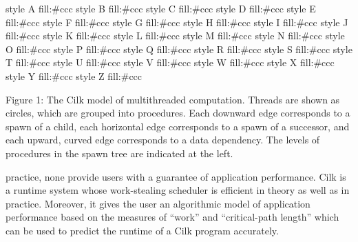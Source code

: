 \documentclass[
]{article}
\newenvironment{Shaded}{}{}
\newcommand{\NormalTok}[1]{#1}
\newcounter{none} %
\begin{document}
\begin{Shaded}
\begin{Highlighting}[]
\NormalTok{    style A fill:\#ccc}
\NormalTok{    style B fill:\#ccc}
\NormalTok{    style C fill:\#ccc}
\NormalTok{    style D fill:\#ccc}
\NormalTok{    style E fill:\#ccc}
\NormalTok{    style F fill:\#ccc}
\NormalTok{    style G fill:\#ccc}
\NormalTok{    style H fill:\#ccc}
\NormalTok{    style I fill:\#ccc}
\NormalTok{    style J fill:\#ccc}
\NormalTok{    style K fill:\#ccc}
\NormalTok{    style L fill:\#ccc}
\NormalTok{    style M fill:\#ccc}
\NormalTok{    style N fill:\#ccc}
\NormalTok{    style O fill:\#ccc}
\NormalTok{    style P fill:\#ccc}
\NormalTok{    style Q fill:\#ccc}
\NormalTok{    style R fill:\#ccc}
\NormalTok{    style S fill:\#ccc}
\NormalTok{    style T fill:\#ccc}
\NormalTok{    style U fill:\#ccc}
\NormalTok{    style V fill:\#ccc}
\NormalTok{    style W fill:\#ccc}
\NormalTok{    style X fill:\#ccc}
\NormalTok{    style Y fill:\#ccc}
\NormalTok{    style Z fill:\#ccc}
\end{Highlighting}
\end{Shaded}

Figure 1: The Cilk model of multithreaded computation. Threads are shown
as circles, which are grouped into procedures. Each downward edge
corresponds to a spawn of a child, each horizontal edge corresponds to a
spawn of a successor, and each upward, curved edge corresponds to a data
dependency. The levels of procedures in the spawn tree are indicated at
the left.

practice, none provide users with a guarantee of application
performance. Cilk is a runtime system whose work-stealing scheduler is
efficient in theory as well as in practice. Moreover, it gives the user
an algorithmic model of application performance based on the measures of
``work'' and ``critical-path length'' which can be used to predict the
runtime of a Cilk program accurately.
\end{document}
